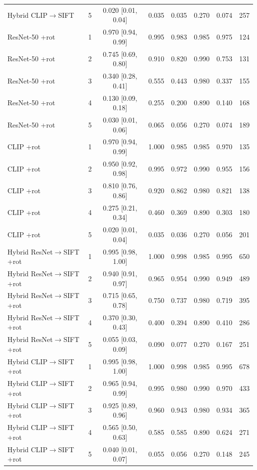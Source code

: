 \begin{table}[p]
\begin{tabular}{@{}llcccccr@{}}
Hybrid CLIP$\to$SIFT & 5 & 0.020 {\scriptsize[0.01, 0.04]} & 0.035 & 0.035 & 0.270 & 0.074 & 257\\
ResNet-50 +rot & 1 & 0.970 {\scriptsize[0.94, 0.99]} & 0.995 & 0.983 & 0.985 & 0.975 & 124\\
ResNet-50 +rot & 2 & 0.745 {\scriptsize[0.69, 0.80]} & 0.910 & 0.820 & 0.990 & 0.753 & 131\\
ResNet-50 +rot & 3 & 0.340 {\scriptsize[0.28, 0.41]} & 0.555 & 0.443 & 0.980 & 0.337 & 155\\
ResNet-50 +rot & 4 & 0.130 {\scriptsize[0.09, 0.18]} & 0.255 & 0.200 & 0.890 & 0.140 & 168\\
ResNet-50 +rot & 5 & 0.030 {\scriptsize[0.01, 0.06]} & 0.065 & 0.056 & 0.270 & 0.074 & 189\\
CLIP +rot & 1 & 0.970 {\scriptsize[0.94, 0.99]} & 1.000 & 0.985 & 0.985 & 0.970 & 135\\
CLIP +rot & 2 & 0.950 {\scriptsize[0.92, 0.98]} & 0.995 & 0.972 & 0.990 & 0.955 & 156\\
CLIP +rot & 3 & 0.810 {\scriptsize[0.76, 0.86]} & 0.920 & 0.862 & 0.980 & 0.821 & 138\\
CLIP +rot & 4 & 0.275 {\scriptsize[0.21, 0.34]} & 0.460 & 0.369 & 0.890 & 0.303 & 180\\
CLIP +rot & 5 & 0.020 {\scriptsize[0.01, 0.04]} & 0.035 & 0.036 & 0.270 & 0.056 & 201\\
Hybrid ResNet$\to$SIFT +rot & 1 & 0.995 {\scriptsize[0.98, 1.00]} & 1.000 & 0.998 & 0.985 & 0.995 & 650\\
Hybrid ResNet$\to$SIFT +rot & 2 & 0.940 {\scriptsize[0.91, 0.97]} & 0.965 & 0.954 & 0.990 & 0.949 & 489\\
Hybrid ResNet$\to$SIFT +rot & 3 & 0.715 {\scriptsize[0.65, 0.78]} & 0.750 & 0.737 & 0.980 & 0.719 & 395\\
Hybrid ResNet$\to$SIFT +rot & 4 & 0.370 {\scriptsize[0.30, 0.43]} & 0.400 & 0.394 & 0.890 & 0.410 & 286\\
Hybrid ResNet$\to$SIFT +rot & 5 & 0.055 {\scriptsize[0.03, 0.09]} & 0.090 & 0.077 & 0.270 & 0.167 & 251\\
Hybrid CLIP$\to$SIFT +rot & 1 & 0.995 {\scriptsize[0.98, 1.00]} & 1.000 & 0.998 & 0.985 & 0.995 & 678\\
Hybrid CLIP$\to$SIFT +rot & 2 & 0.965 {\scriptsize[0.94, 0.99]} & 0.995 & 0.980 & 0.990 & 0.970 & 433\\
Hybrid CLIP$\to$SIFT +rot & 3 & 0.925 {\scriptsize[0.89, 0.96]} & 0.960 & 0.943 & 0.980 & 0.934 & 365\\
Hybrid CLIP$\to$SIFT +rot & 4 & 0.565 {\scriptsize[0.50, 0.63]} & 0.585 & 0.585 & 0.890 & 0.624 & 271\\
Hybrid CLIP$\to$SIFT +rot & 5 & 0.040 {\scriptsize[0.01, 0.07]} & 0.055 & 0.056 & 0.270 & 0.148 & 245\\
\bottomrule
\end{tabular}
\end{table}
